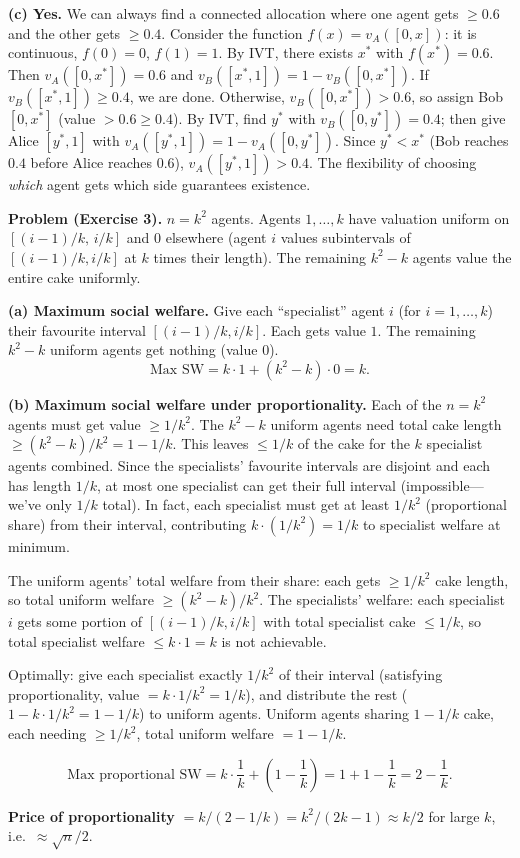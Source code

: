\begin{exbox}
\textbf{(c) Yes.} We can always find a connected allocation where one agent gets $\ge 0.6$ and the other gets $\ge 0.4$. Consider the function $f(x) = v_A([0, x])$: it is continuous, $f(0)=0$, $f(1)=1$. By IVT, there exists $x^*$ with $f(x^*) = 0.6$. Then $v_A([0, x^*]) = 0.6$ and $v_B([x^*, 1]) = 1 - v_B([0, x^*])$. If $v_B([x^*,1]) \ge 0.4$, we are done. Otherwise, $v_B([0, x^*]) > 0.6$, so assign Bob $[0, x^*]$ (value $> 0.6 \ge 0.4$). By IVT, find $y^*$ with $v_B([0, y^*]) = 0.4$; then give Alice $[y^*, 1]$ with $v_A([y^*, 1]) = 1 - v_A([0, y^*])$. Since $y^* < x^*$ (Bob reaches $0.4$ before Alice reaches $0.6$), $v_A([y^*,1]) > 0.4$. The flexibility of choosing \emph{which} agent gets which side guarantees existence.
\end{exbox}

\separator

\begin{exbox}
\textbf{Problem (Exercise 3).} $n = k^2$ agents. Agents $1, \ldots, k$ have valuation uniform on $[(i-1)/k,\, i/k]$ and $0$ elsewhere (agent $i$ values subintervals of $[(i-1)/k, i/k]$ at $k$ times their length). The remaining $k^2 - k$ agents value the entire cake uniformly.

\textbf{(a) Maximum social welfare.}
Give each ``specialist'' agent $i$ (for $i = 1, \ldots, k$) their favourite interval $[(i-1)/k, i/k]$. Each gets value $1$. The remaining $k^2 - k$ uniform agents get nothing (value $0$).
\[
  \text{Max SW} = k \cdot 1 + (k^2 - k) \cdot 0 = k.
\]

\textbf{(b) Maximum social welfare under proportionality.}
Each of the $n = k^2$ agents must get value $\ge 1/k^2$. The $k^2 - k$ uniform agents need total cake length $\ge (k^2 - k)/k^2 = 1 - 1/k$. This leaves $\le 1/k$ of the cake for the $k$ specialist agents combined. Since the specialists' favourite intervals are disjoint and each has length $1/k$, at most one specialist can get their full interval (impossible---we've only $1/k$ total). In fact, each specialist must get at least $1/k^2$ (proportional share) from their interval, contributing $k \cdot (1/k^2) = 1/k$ to specialist welfare at minimum.

The uniform agents' total welfare from their share: each gets $\ge 1/k^2$ cake length, so total uniform welfare $\ge (k^2 - k)/k^2$. The specialists' welfare: each specialist $i$ gets some portion of $[(i-1)/k, i/k]$ with total specialist cake $\le 1/k$, so total specialist welfare $\le k \cdot 1 = k$ is not achievable.

Optimally: give each specialist exactly $1/k^2$ of their interval (satisfying proportionality, value $= k \cdot 1/k^2 = 1/k$), and distribute the rest ($1 - k \cdot 1/k^2 = 1 - 1/k$) to uniform agents. Uniform agents sharing $1 - 1/k$ cake, each needing $\ge 1/k^2$, total uniform welfare $= 1 - 1/k$.

\[
  \text{Max proportional SW} = k \cdot \frac{1}{k} + (1 - \frac{1}{k}) = 1 + 1 - \frac{1}{k} = 2 - \frac{1}{k}.
\]

\textbf{Price of proportionality} $= k / (2 - 1/k) = k^2 / (2k - 1) \approx k/2$ for large $k$, i.e.\ $\approx \sqrt{n}/2$.
\end{exbox}

